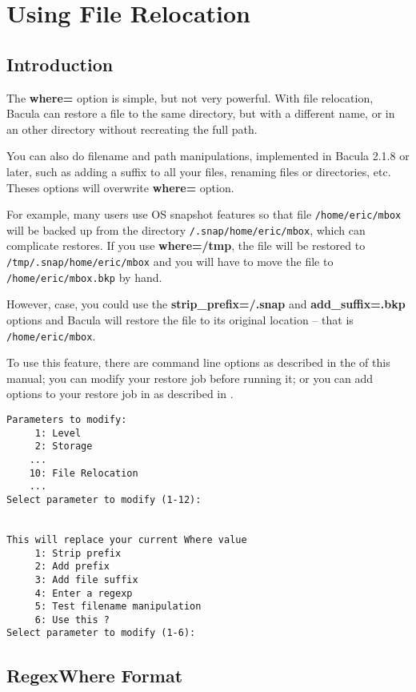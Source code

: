 \label{restorefilerelocation}
\section{Using File Relocation}
\label{filerelocation}

\subsection{Introduction}

The \textbf{where=} option is simple, but not very powerful. With file
relocation, Bacula can restore a file to the same directory, but with a
different name, or in an other directory without recreating the full path.

You can also do filename and path manipulations, implemented in Bacula
2.1.8 or later, such as adding a suffix to all your files, renaming files
or directories, etc.  Theses options will overwrite {\bf where=} option.


For example, many users use OS snapshot features so that file
\texttt{/home/eric/mbox} will be backed up from the directory
\texttt{/.snap/home/eric/mbox}, which can complicate restores.  If you use
\textbf{where=/tmp}, the file will be restored to
\texttt{/tmp/.snap/home/eric/mbox} and you will have to move the file to
\texttt{/home/eric/mbox.bkp} by hand.  

However, case, you could use the
\textbf{strip\_prefix=/.snap} and \textbf{add\_suffix=.bkp} options and
Bacula will restore the file to its original location -- that is
\texttt{/home/eric/mbox}.

To use this feature, there are command line options as described in 
the  of this manual;
you can modify your restore job before running it; or you can
add options to your restore job in as described in 
.

\begin{verbatim}
Parameters to modify:
     1: Level
     2: Storage
    ...
    10: File Relocation
    ...
Select parameter to modify (1-12):


This will replace your current Where value
     1: Strip prefix
     2: Add prefix
     3: Add file suffix
     4: Enter a regexp
     5: Test filename manipulation
     6: Use this ?
Select parameter to modify (1-6):   
\end{verbatim}


\subsection{RegexWhere Format}

